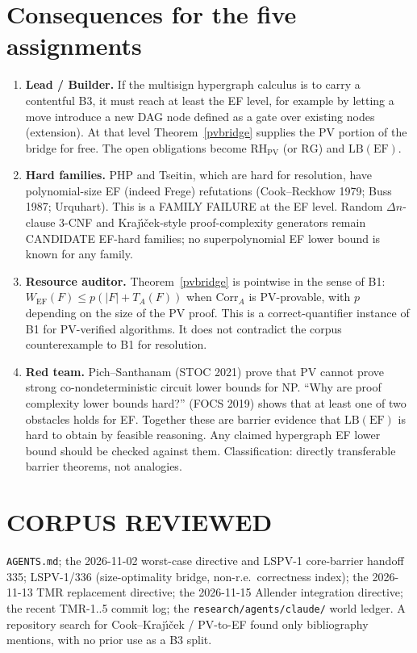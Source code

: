 \documentclass[11pt]{article}
\theoremstyle{definition}
\theoremstyle{remark}
\begin{document}
\section{Consequences for the five assignments}
\begin{enumerate}
\item \textbf{Lead / Builder.} If the multisign hypergraph calculus is to carry a contentful B3, it must reach at least the EF level, for example by letting a move introduce a new DAG node defined as a gate over existing nodes (extension). At that level Theorem~\ref{pvbridge} supplies the PV portion of the bridge for free. The open obligations become $\mathrm{RH}_{\mathrm{PV}}$ (or $\mathrm{RG}$) and $\mathrm{LB}(\mathrm{EF})$.
\item \textbf{Hard families.} PHP and Tseitin, which are hard for resolution, have polynomial-size EF (indeed Frege) refutations (Cook--Reckhow 1979; Buss 1987; Urquhart). This is a FAMILY FAILURE at the EF level. Random $\Delta n$-clause 3-CNF and Kraj\'{\i}\v{c}ek-style proof-complexity generators remain CANDIDATE EF-hard families; no superpolynomial EF lower bound is known for any family.
\item \textbf{Resource auditor.} Theorem~\ref{pvbridge} is pointwise in the sense of B1: $W_{\mathrm{EF}}(F)\le p(|F|+T_A(F))$ when $\mathrm{Corr}_A$ is PV-provable, with $p$ depending on the size of the PV proof. This is a correct-quantifier instance of B1 for PV-verified algorithms. It does not contradict the corpus counterexample to B1 for resolution.
\item \textbf{Red team.} Pich--Santhanam (STOC 2021) prove that PV cannot prove strong co-nondeterministic circuit lower bounds for NP. ``Why are proof complexity lower bounds hard?'' (FOCS 2019) shows that at least one of two obstacles holds for EF. Together these are barrier evidence that $\mathrm{LB}(\mathrm{EF})$ is hard to obtain by feasible reasoning. Any claimed hypergraph EF lower bound should be checked against them. Classification: directly transferable barrier theorems, not analogies.
\end{enumerate}

\section*{CORPUS REVIEWED}
\texttt{AGENTS.md}; the 2026-11-02 worst-case directive and LSPV-1 core-barrier handoff 335; LSPV-1/336 (size-optimality bridge, non-r.e.\ correctness index); the 2026-11-13 TMR replacement directive; the 2026-11-15 Allender integration directive; the recent TMR-1..5 commit log; the \texttt{research/agents/claude/} world ledger. A repository search for Cook--Kraj\'{\i}\v{c}ek / PV-to-EF found only bibliography mentions, with no prior use as a B3 split.
\end{document}
